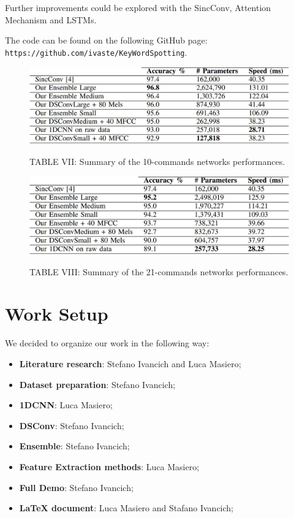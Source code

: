 \documentclass[conference]{IEEEtran}
\begin{document}
Further improvements could be explored with the SincConv, Attention Mechanism and LSTMs.

The code can be found on the following GitHub page: \texttt{https://github.com/ivaste/KeyWordSpotting}.

\begin{figure}
\centering
\includegraphics[scale=0.3]{tab1}
\begin{center}
TABLE VII: Summary of the 10-commands networks performances.
\end{center}
\end{figure}

\begin{figure}
\centering
\includegraphics[scale=0.3]{tab2}
\begin{center}
TABLE VIII: Summary of the 21-commands networks performances.
\end{center}
\end{figure}

\newpage
\section*{Work Setup}
We decided to organize our work in the following way:
\begin{itemize}
\item \textbf{Literature research}: Stefano Ivancich and Luca Masiero;
\item \textbf{Dataset preparation}: Stefano Ivancich;
\item \textbf{1DCNN}: Luca Masiero;
\item \textbf{DSConv}: Stefano Ivancich;
\item \textbf{Ensemble}: Stefano Ivancich;
\item \textbf{Feature Extraction methods}: Luca Masiero;
\item \textbf{Full Demo}: Stefano Ivancich;
\item \textbf{\LaTeX\xspace document}: Luca Masiero and Stafano Ivancich;
\end{itemize}
\end{document}

